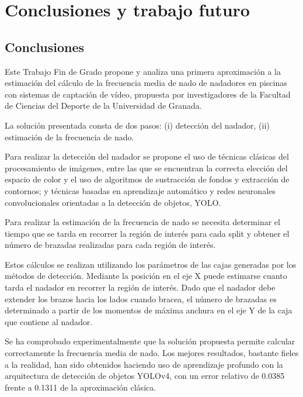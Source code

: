 \chapter{Conclusiones y trabajo futuro} \label{cap:capitulo6}

\section{Conclusiones}

Este Trabajo Fin de Grado propone y analiza una primera aproximación a la estimación del cálculo de la frecuencia media de nado de nadadores en piscinas con sistemas de captación de vídeo, propuesta por investigadores de la Facultad de Ciencias del Deporte de la Universidad de Granada. 

La solución presentada consta de dos pasos: (i) detección del nadador, (ii) estimación de la frecuencia de nado. 

Para realizar la detección del nadador se propone el uso de técnicas clásicas del procesamiento de imágenes, entre las que se encuentran la correcta elección del espacio de color y el uso de algoritmos de sustracción de fondos y extracción de contornos; y técnicas basadas en aprendizaje automático y redes neuronales convolucionales orientadas a la detección de objetos, YOLO. 

Para realizar la estimación de la frecuencia de nado se necesita determinar el tiempo que se tarda en recorrer la región de interés para cada split y obtener el número de brazadas realizadas para cada región de interés.

Estos cálculos se realizan utilizando los parámetros de las cajas generadas por los métodos de detección. Mediante la posición en el eje X puede estimarse cuanto tarda el nadador en recorrer la región de interés. Dado que el nadador debe extender los brazos hacia los lados cuando bracea, el número de brazadas es determinado a partir de los momentos de máxima anchura en el eje Y de la caja que contiene al nadador.

Se ha comprobado experimentalmente que la solución propuesta permite calcular correctamente la frecuencia media de nado. Los mejores resultados, bastante fieles a la realidad, han sido obtenidos haciendo uso de aprendizaje profundo con la arquitectura de detección de objetos YOLOv4, con un error relativo de 0.0385 frente a 0.1311 de la aproximación clásica.

